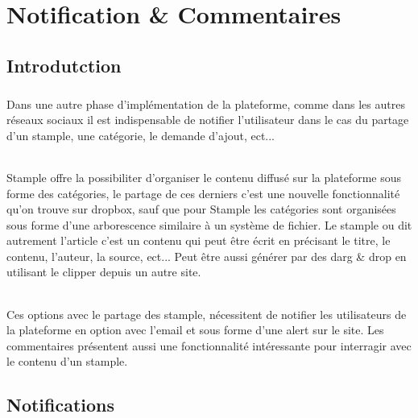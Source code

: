\chapter{Notification \& Commentaires}
\section{Introdutction}
\paragraph{}
Dans une autre phase d'implémentation de la plateforme, comme dans les autres réseaux sociaux il est indispensable de notifier l'utilisateur dans le cas du partage d'un stample, une catégorie, le demande d'ajout, ect...
\subparagraph{}
Stample offre la possibiliter d'organiser le contenu diffusé sur la plateforme sous forme des catégories, le partage de ces derniers c'est une nouvelle fonctionnalité qu'on trouve sur dropbox, sauf que pour Stample les catégories sont organisées sous forme d'une arborescence similaire à un système de fichier.
\newline
Le stample ou dit autrement l'article c'est un contenu qui peut être écrit en précisant le titre, le contenu, l'auteur, la source, ect...
Peut être aussi générer par des darg \& drop en utilisant le clipper depuis un autre site.
\subparagraph{}
Ces options avec le partage des stample, nécessitent de notifier les utilisateurs de la plateforme en option avec l'email et sous forme d'une alert sur le site.
\newline
Les commentaires présentent aussi une fonctionnalité intéressante pour interragir avec le contenu d'un stample.
\section{Notifications}
